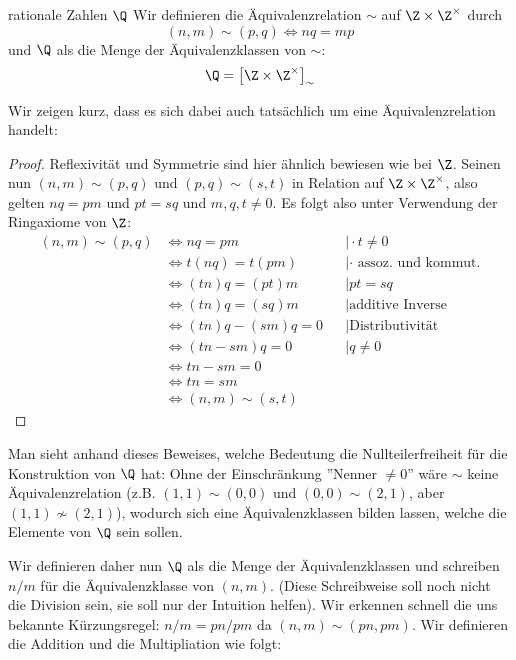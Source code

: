 \begin{definition}{rationale Zahlen $\Q$}{}
Wir definieren die Äquivalenzrelation $\sim$ auf $\Z \times \Z^\times$ durch
$$(n, m) \sim (p, q) \iff nq = mp$$
und $\Q$ als die Menge der Äquivalenzklassen von $\sim$:
$$\Q = \big[\Z \times \Z^\times\big]_\sim$$
\end{definition}
Wir zeigen kurz, dass es sich dabei auch tatsächlich um eine Äquivalenzrelation handelt:
\begin{proof} Reflexivität und Symmetrie sind hier ähnlich bewiesen wie bei $\Z$. Seinen nun $(n, m) \sim (p, q)$ und $(p, q) \sim (s, t)$ in Relation auf $\Z \times \Z^\times$, also gelten  $nq = pm$ und $pt = sq$ und $m, q, t \neq 0$. Es folgt also unter Verwendung der Ringaxiome von $\Z$:
\begin{align*}
   (n, m) \sim (p, q) &\iff nq = pm&& \mid  \cdot t \neq 0\\
            &\iff t(nq) = t(pm)&& \mid  \text{$\cdot$ assoz. und kommut.}\\
            &\iff (tn)q = (pt)m&& \mid  pt = sq\\
            &\iff (tn)q = (sq)m&& \mid  \text{additive Inverse}\\
            &\iff (tn)q - (sm)q = 0&& \mid  \text{Distributivität}\\
            &\iff (tn - sm)q = 0 & &\mid  q \neq 0\\
            &\iff tn - sm = 0\\
            &\iff tn = sm\\
            &\iff (n, m) \sim (s, t)
\end{align*}\end{proof}

\begin{remark}
Man sieht anhand dieses Beweises, welche Bedeutung die Nullteilerfreiheit für die Konstruktion von $\Q$ hat: Ohne der Einschränkung ''Nenner $\neq 0$'' wäre $\sim$ keine Äquivalenzrelation (z.B. $(1,1) \sim (0, 0)$ und $(0,0) \sim (2, 1)$, aber $(1,1) \nsim (2,1)$), wodurch sich eine Äquivalenzklassen bilden lassen, welche die Elemente von $\Q$ sein sollen.
\end{remark}

Wir definieren daher nun $\Q$ als die Menge der Äquivalenzklassen und schreiben $n/m$ für die Äquivalenzklasse von $(n,m)$. (Diese Schreibweise soll noch nicht die Division sein, sie soll nur der Intuition helfen). Wir erkennen schnell die uns bekannte Kürzungsregel: $n/m = pn/pm$ da $(n, m) \sim (pn, pm)$. Wir definieren die Addition und die Multipliation wie folgt:

